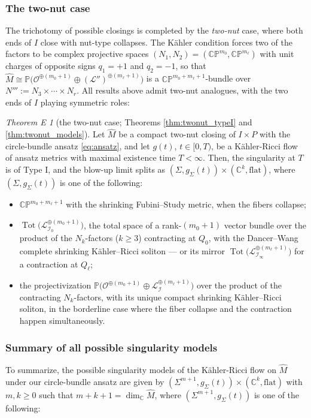 \documentclass[11pt]{amsart}
\theoremstyle{plain}
\numberwithin{equation}{section}
\theoremstyle{definition}
\theoremstyle{remark}
\newtheorem*{thmE}{Theorem E}
\begin{document}
\subsubsection{The two-nut case}
The trichotomy of possible closings is completed by the \emph{two-nut} case, where both ends of $I$ close with nut-type collapses. The K\"ahler condition forces two of the factors to be complex projective spaces $(N_1, N_2) = (\mathbb{CP}^{m_0}, \mathbb{CP}^{m_\ell})$ with unit charges of opposite signs $q_1 = +1$ and $q_2 = -1$, so that $\widehat{M} \cong \mathbb{P}\big(\mathcal{O}^{\oplus(m_0+1)} \oplus (\mathcal{L}'')^{\oplus(m_\ell+1)}\big)$ is a $\mathbb{CP}^{m_0+m_\ell+1}$-bundle over $N''' := N_3 \times \cdots \times N_r$. All results above admit two-nut analogues, with the two ends of $I$ playing symmetric roles:

\begin{thmE}[the two-nut case; Theorems \ref{thm:twonut_typeI} and \ref{thm:twonut_models}]
Let $\widehat{M}$ be a compact two-nut closing of $I \times P$ with the circle-bundle ansatz \eqref{eq:ansatz}, and let $g(t)$, $t \in [0, T)$, be a K\"ahler-Ricci flow of ansatz metrics with maximal existence time $T < \infty$. Then, the singularity at $T$ is of Type I, and the blow-up limit splits as $(\Sigma, g_\Sigma(t)) \times (\mathbb{C}^k, \textrm{flat})$, where $(\Sigma, g_\Sigma(t))$ is one of the following:
\begin{itemize}
\item $\mathbb{CP}^{m_0+m_\ell+1}$ with the shrinking Fubini--Study metric, when the fibers collapse;
\item $\operatorname{Tot}\big(\mathcal{L}_{\mathcal{I}_0}^{\oplus(m_0+1)}\big)$, the total space of a rank-$(m_0+1)$ vector bundle over the product of the $N_k$-factors ($k \geq 3$) contracting at $Q_0$, with the Dancer--Wang complete shrinking K\"ahler--Ricci soliton --- or its mirror $\operatorname{Tot}\big(\mathcal{L}_{\mathcal{I}_\infty}^{\oplus(m_\ell+1)}\big)$ for a contraction at $Q_\ell$;
\item the projectivization $\mathbb{P}\big(\mathcal{O}^{\oplus(m_0+1)} \oplus \mathcal{L}_{\mathcal{I}}^{\oplus(m_\ell+1)}\big)$ over the product of the contracting $N_k$-factors, with its unique compact shrinking K\"ahler--Ricci soliton, in the borderline case where the fiber collapse and the contraction happen simultaneously.
\end{itemize}
\end{thmE}

\subsubsection{Summary of all possible singularity models}
To summarize, the possible singularity models of the K\"ahler-Ricci flow on $\widehat{M}$ under our circle-bundle ansatz are given by $(\Sigma^{m+1}, g_\Sigma(t)) \times (\mathbb{C}^k, \textrm{flat})$ with $m, k \geq 0$ such that $m+k+1 = \dim_{\mathbb{C}}\widehat{M}$, where $(\Sigma^{m+1}, g_\Sigma(t))$ is one of the following:
\end{document}
